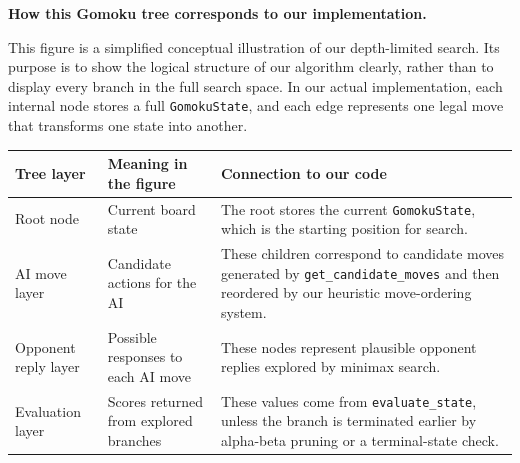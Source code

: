 \documentclass[11pt]{article}
\begin{document}
\begin{center}
{
}
\end{center}

\noindent
\textbf{How this Gomoku tree corresponds to our implementation.}

This figure is a simplified conceptual illustration of our depth-limited search. Its purpose is to show the logical structure of our algorithm clearly, rather than to display every branch in the full search space. In our actual implementation, each internal node stores a full \texttt{GomokuState}, and each edge represents one legal move that transforms one state into another.

\begin{center}
\begin{tabularx}{0.96\textwidth}{>{\raggedright\arraybackslash}p{} >{\raggedright\arraybackslash}p{} X}
\toprule
\textbf{Tree layer} & \textbf{Meaning in the figure} & \textbf{Connection to our code} \\
\midrule
Root node & Current board state & The root stores the current \texttt{GomokuState}, which is the starting position for search. \\
AI move layer & Candidate actions for the AI & These children correspond to candidate moves generated by \texttt{get\_candidate\_moves} and then reordered by our heuristic move-ordering system. \\
Opponent reply layer & Possible responses to each AI move & These nodes represent plausible opponent replies explored by minimax search. \\
Evaluation layer & Scores returned from explored branches & These values come from \texttt{evaluate\_state}, unless the branch is terminated earlier by alpha-beta pruning or a terminal-state check. \\
\bottomrule
\end{tabularx}
\end{center}
\end{document}
